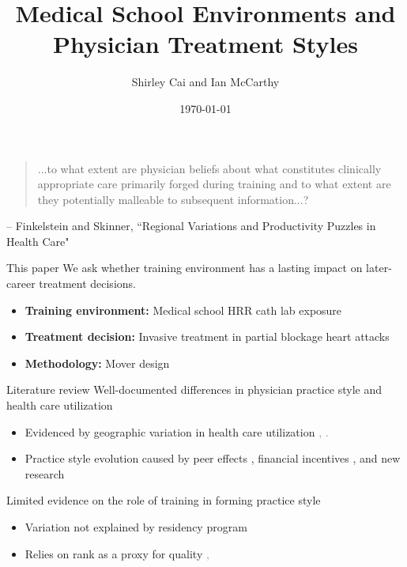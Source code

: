 \documentclass[10pt,aspectratio=169]{beamer}
\title{Medical School Environments and \\Physician Treatment Styles}
\author{Shirley Cai and Ian McCarthy}
\date{\today}
\institute{Department of Economics\\Emory University}
\begin{document}
\maketitle

\begin{frame}[plain]{}
    \begin{quote}
        ...to what extent are physician beliefs about what constitutes clinically appropriate care primarily forged during training and to what extent are they potentially malleable to subsequent information...?
    \end{quote}
    \hfill{\small -- Finkelstein and Skinner, ``Regional Variations and Productivity Puzzles in Health Care"}
\end{frame}

\begin{frame}{This paper}
    We ask whether training environment has a lasting impact on later-career treatment decisions.

    \vspace{5mm}
    \begin{itemize}
        \item \textbf{Training environment:} Medical school HRR cath lab exposure
        \item \textbf{Treatment decision:} Invasive treatment in partial blockage heart attacks
        \item \textbf{Methodology:} Mover design
    \end{itemize}
\end{frame}

\begin{frame}{Literature review}
    Well-documented differences in physician practice style and health care utilization
        \begin{itemize}
            \item Evidenced by geographic variation in health care utilization \textcolor{gray}{\scriptsize\textcite{finkelstein2016}, \textcite{cutler2019}. \textcite{badinski2023}}
            \item Practice style evolution caused by peer effects \textcolor{gray}{\scriptsize\textcite{molitor2018}}, financial incentives \textcolor{gray}{\scriptsize\textcite{clemens_physician_2024}}, and new research \textcolor{gray}{\scriptsize\textcite{decicca_how_2024}}
        \end{itemize}

    \vspace{5mm}
    Limited evidence on the role of training in forming practice style
        \begin{itemize}
            \item Variation not explained by residency program \textcolor{gray}{\scriptsize\textcite{epstein2009}}
            \item Relies on rank as a proxy for quality \textcolor{gray}{\scriptsize\textcite{doyle_jr_returns_2010}, \textcite{schnell2018}}
        \end{itemize}
\end{frame}
\end{document}
